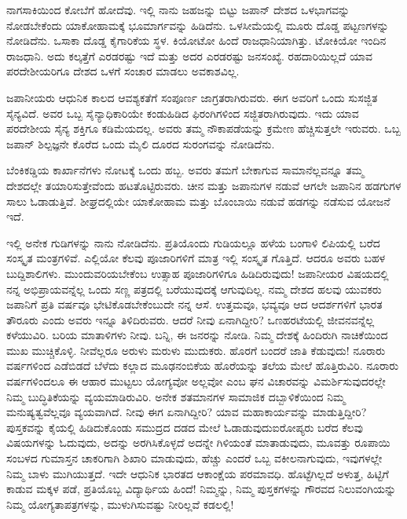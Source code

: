 ನಾಗಸಾಕಿಯಿಂದ ಕೋಬೆಗೆ ಹೋದೆವು. ಇಲ್ಲಿ ನಾನು ಜಹಜನ್ನು ಬಿಟ್ಟು ಜಪಾನ್ ದೇಶದ ಒಳಭಾಗವನ್ನು ನೋಡಬೇಕೆಂದು ಯಾಕೋಹಾಮಕ್ಕೆ ಭೂಮಾರ್ಗವನ್ನು ಹಿಡಿದೆನು. ಒಳಸೀಮೆಯಲ್ಲಿ ಮೂರು ದೊಡ್ಡ ಪಟ್ಟಣಗಳನ್ನು ನೋಡಿದೆನು. ಒಸಾಕಾ ದೊಡ್ಡ ಕೈಗಾರಿಕೆಯ ಸ್ಥಳ. ಕಿಯೋಟೋ ಹಿಂದೆ ರಾಜಧಾನಿಯಾಗಿತ್ತು. ಟೋಕಿಯೋ ಇಂದಿನ ರಾಜಧಾನಿ. ಅದು ಕಲ್ಕತ್ತೆಗೆ ಎರಡರಷ್ಟು ಇದೆ ಮತ್ತು ಅದರ ಎರಡರಷ್ಟು ಜನಸಂಖ್ಯೆ. ರಹದಾರಿಯಿಲ್ಲದೆ ಯಾವ ಪರದೇಶೀಯರಿಗೂ ದೇಶದ ಒಳಗೆ ಸಂಚಾರ ಮಾಡಲು ಅವಕಾಶವಿಲ್ಲ.

ಜಪಾನೀಯರು ಆಧುನಿಕ ಕಾಲದ ಆವಶ್ಯಕತೆಗೆ ಸಂಪೂರ್ಣ ಜಾಗ್ರತರಾಗಿರುವರು. ಈಗ ಅವರಿಗೆ ಒಂದು ಸುಸಜ್ಜಿತ ಸೈನ್ಯವಿದೆ. ಅವರ ಒಬ್ಬ ಸೈನ್ಯಾಧಿಕಾರಿಯೇ ಕಂಡುಹಿಡಿದ ಫಿರಂಗಿಗಳಿಂದ ಸಜ್ಜಿತರಾಗಿರುವುದು. ಇದು ಯಾವ ಪರದೇಶೀಯ ಸೈನ್ಯ ಶಕ್ತಿಗೂ ಕಡಿಮೆಯದಲ್ಲ. ಅವರು ತಮ್ಮ ನೌಕಾಪಡೆಯನ್ನು ಕ್ರಮೇಣ ಹೆಚ್ಚಿಸುತ್ತಲೇ ಇರುವರು. ಒಬ್ಬ ಜಪಾನ್ ಶಿಲ್ಪಜ್ಞನೇ ಕೊರೆದ ಒಂದು ಮೈಲಿ ದೂರದ ಸುರಂಗವನ್ನು ನೋಡಿದೆನು.

ಬೆಂಕಿಕಡ್ಡಿಯ ಕಾರ್ಖಾನೆಗಳು ನೋಟಕ್ಕೆ ಒಂದು ಹಬ್ಬ. ಅವರು ತಮಗೆ ಬೇಕಾಗುವ ಸಾಮಾನೆಲ್ಲವನ್ನೂ ತಮ್ಮ ದೇಶದಲ್ಲೇ ತಯಾರಿಸುತ್ತೇವೆಂದು ಹಟತೊಟ್ಟಿರುವರು. ಚೀನ ಮತ್ತು ಜಪಾನುಗಳ ನಡುವೆ ಆಗಲೇ ಜಪಾನಿನ ಹಡಗುಗಳ ಸಾಲು ಓಡಾಡುತ್ತಿವೆ. ಶೀಘ್ರದಲ್ಲಿಯೇ ಯಾಕೋಹಾಮ ಮತ್ತು ಬೊಂಬಾಯಿ ನಡುವೆ ಹಡಗನ್ನು ನಡೆಸುವ ಯೋಜನೆ ಇದೆ.

ಇಲ್ಲಿ ಅನೇಕ ಗುಡಿಗಳನ್ನು ನಾನು ನೋಡಿದೆನು. ಪ್ರತಿಯೊಂದು ಗುಡಿಯಲ್ಲೂ ಹಳೆಯ ಬಂಗಾಳಿ ಲಿಪಿಯಲ್ಲಿ ಬರೆದ ಸಂಸ್ಕೃತ ಮಂತ್ರಗಳಿವೆ. ಎಲ್ಲಿಯೋ ಕೆಲವು ಪೂಜಾರಿಗಳಿಗೆ ಮಾತ್ರ ಇಲ್ಲಿ ಸಂಸ್ಕೃತ ಗೊತ್ತಿದೆ. ಆದರೂ ಅವರು ಬಹಳ ಬುದ್ದಿಶಾಲಿಗಳು. ಮುಂದುವರಿಯಬೇಕೆಂಬ ಉತ್ಸಾಹ ಪೂಜಾರಿಗಳಿಗೂ ಹಿಡಿದಿರುವುದು! ಜಪಾನೀಯರ ವಿಷಯದಲ್ಲಿ ನನ್ನ ಅಭಿಪ್ರಾಯವನ್ನೆಲ್ಲ ಒಂದು ಸಣ್ಣ ಪತ್ರದಲ್ಲಿ ಬರೆಯುವುದಕ್ಕೆ ಆಗುವುದಿಲ್ಲ. ನಮ್ಮ ದೇಶದ ಹಲವು ಯುವಕರು ಜಪಾನಿಗೆ ಪ್ರತಿ ವರ್ಷವೂ ಭೇಟಿಕೊಡಬೇಕೆಂಬುದೇ ನನ್ನ ಆಸೆ. ಉತ್ತಮವೂ, ಭವ್ಯವೂ ಆದ ಆದರ್ಶಗಳಿಗೆ ಭಾರತ ತೌರೂರು ಎಂದು ಅವರು ಇನ್ನೂ ತಿಳಿದಿರುವರು. ಆದರೆ ನೀವು ಏನಾಗಿದ್ದೀರಿ? ಒಣಹರಟೆಯಲ್ಲಿ ಜೀವನವನ್ನೆಲ್ಲ ಕಳೆಯುವಿರಿ. ಬರಿಯ ಮಾತಾಳಿಗಳು ನೀವು. ಬನ್ನಿ, ಈ ಜನರನ್ನು ನೋಡಿ. ನಿಮ್ಮ ದೇಶಕ್ಕೆ ಹಿಂದಿರುಗಿ ನಾಚಿಕೆಯಿಂದ ಮುಖ ಮುಚ್ಚಿಕೊಳ್ಳಿ. ನೀವೆಲ್ಲರೂ ಅರುಳು ಮರುಳು ಮುದುಕರು. ಹೊರಗೆ ಬಂದರೆ ಜಾತಿ ಕೆಡುವುದು! ನೂರಾರು ವರ್ಷಗಳಿಂದ ಎಡೆಬಿಡದೆ ಬೆಳೆದು ಕಲ್ಲಾದ ಮೂಢನಂಬಿಕೆಯ ಹೊರೆಯನ್ನು ತಲೆಯ ಮೇಲೆ ಹೊತ್ತಿರುವಿರಿ. ನೂರಾರು ವರ್ಷಗಳಿಂದಲೂ ಈ ಆಹಾರ ಮುಟ್ಟಲು ಯೋಗ್ಯವೋ ಅಲ್ಲವೋ ಎಂಬ ಘನ ವಿಚಾರವನ್ನು ವಿಮರ್ಶಿಸುವುದರಲ್ಲೇ ನಿಮ್ಮ ಬುದ್ಧಿತಿಕೆಯನ್ನು ವ್ಯಯಮಾಡಿರುವಿರಿ. ಅನೇಕ ಶತಮಾನಗಳ ಸಾಮಾಜಿಕ ದಬ್ಬಾಳಿಕೆಯಿಂದ ನಿಮ್ಮ ಮನುಷ್ಯತ್ವವೆಲ್ಲವೂ ವ್ಯಯವಾಗಿದೆ. ನೀವು ಈಗ ಏನಾಗಿದ್ದೀರಿ? ಯಾವ ಮಹಾಕಾರ್ಯವನ್ನು ಮಾಡುತ್ತಿದ್ದೀರಿ? ಪುಸ್ತಕವನ್ನು ಕೈಯಲ್ಲಿ ಹಿಡಿದುಕೊಂಡು ಸಮುದ್ರದ ದಡದ ಮೇಲೆ ಓಡಾಡುವುದು\enginline{-}ಐರೋಪ್ಯರು ಬರೆದ ಕೆಲವು ವಿಷಯಗಳನ್ನು ಓದುವುದು, ಅದನ್ನು ಅರಗಿಸಿಕೊಳ್ಳದೆ ಅದನ್ನೇ ಗಿಳಿಯಂತೆ ಮಾತಾಡುವುದು, ಮೂವತ್ತು ರೂಪಾಯಿ ಸಂಬಳದ ಗುಮಾಸ್ತನ ಚಾಕರಿಗಾಗಿ ಶಿಖಾರಿ ಮಾಡುವುದು, ಹೆಚ್ಚು ಎಂದರೆ ಒಬ್ಬ ವಕೀಲನಾಗುವುದು, ಇವುಗಳಲ್ಲೇ ನಿಮ್ಮ ಬಾಳು ಮುಗಿಯುತ್ತದೆ. ಇದೇ ಆಧುನಿಕ ಭಾರತದ ಆಕಾಂಕ್ಷೆಯ ಪರಮಾವಧಿ. ಹೊಟ್ಟೆಗಿಲ್ಲದೆ ಅಳುತ್ತ, ಹಿಟ್ಟಿಗೆ ಕಾಡುವ ಮಕ್ಕಳ ಪಡೆ, ಪ್ರತಿಯೊಬ್ಬ ವಿದ್ಯಾರ್ಥಿಯ ಹಿಂದೆ! ನಿಮ್ಮನ್ನು, ನಿಮ್ಮ ಪುಸ್ತಕಗಳನ್ನು ಗೌರವದ ನಿಲುವಂಗಿಯನ್ನು  ನಿಮ್ಮ ಯೋಗ್ಯತಾಪತ್ರಗಳನ್ನು, ಮುಳುಗಿಸುವಷ್ಟು ನೀರಿಲ್ಲವೆ ಕಡಲಲ್ಲಿ!

